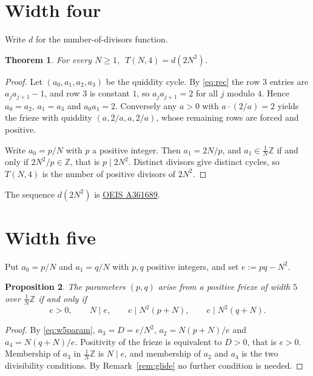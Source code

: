 \documentclass[11pt]{article}
\theoremstyle{plain}
\newtheorem{theorem}{Theorem}[section]
\newtheorem{proposition}[theorem]{Proposition}
\theoremstyle{definition}
\newcommand{\Z}{\mathbb{Z}}
\newcommand{\lat}{\tfrac{1}{N}\Z}
\begin{document}
\section{Width four}\label{sec:w4}

Write $d$ for the number-of-divisors function.

\begin{theorem}\label{thm:w4}
For every $N\ge 1$, $\;T(N,4)=d(2N^2)$.
\end{theorem}

\begin{proof}
Let $(a_0,a_1,a_2,a_3)$ be the quiddity cycle. By \eqref{eq:rec} the row $3$ entries are
$a_ja_{j+1}-1$, and row $3$ is constant $1$, so $a_ja_{j+1}=2$ for all $j$ modulo $4$.
Hence $a_0=a_2$, $a_1=a_3$ and $a_0a_1=2$. Conversely any $a>0$ with $a\cdot(2/a)=2$ yields
the frieze with quiddity $(a,2/a,a,2/a)$, whose remaining rows are forced and positive.

Write $a_0=p/N$ with $p$ a positive integer. Then $a_1=2N/p$, and $a_1\in\lat$ if and only
if $2N^2/p\in\Z$, that is $p\mid 2N^2$. Distinct divisors give distinct cycles, so
$T(N,4)$ is the number of positive divisors of $2N^2$.
\end{proof}

The sequence $d(2N^2)$ is \href{https://oeis.org/A361689}{OEIS A361689}.

\section{Width five}\label{sec:w5}

Put $a_0=p/N$ and $a_1=q/N$ with $p,q$ positive integers, and set $e:=pq-N^2$.

\begin{proposition}\label{prop:w5cond}
The parameters $(p,q)$ arise from a positive frieze of width $5$ over $\lat$ if and only if
\begin{equation}\label{eq:w5cond}
  e>0,\qquad N\mid e,\qquad e \mid N^2(p+N),\qquad e\mid N^2(q+N).
\end{equation}
\end{proposition}

\begin{proof}
By \eqref{eq:w5param}, $a_3=D=e/N^2$, $a_2=N(p+N)/e$ and $a_4=N(q+N)/e$. Positivity of the
frieze is equivalent to $D>0$, that is $e>0$. Membership of $a_3$ in $\lat$ is $N\mid e$,
and membership of $a_2$ and $a_4$ is the two divisibility conditions. By
Remark~\ref{rem:glide} no further condition is needed.
\end{proof}
\end{document}
